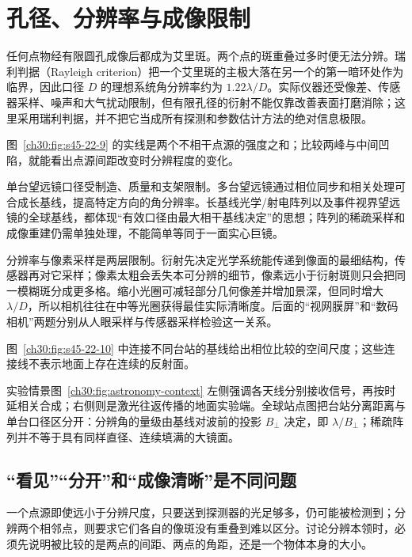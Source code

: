 \section{孔径、分辨率与成像限制}

任何点物经有限圆孔成像后都成为艾里斑。两个点的斑重叠过多时便无法分辨。瑞利判据（Rayleigh criterion）把一个艾里斑的主极大落在另一个的第一暗环处作为临界，因此口径 $D$ 的理想系统角分辨率约为 $1.22\lambda/D$。实际仪器还受像差、传感器采样、噪声和大气扰动限制，但有限孔径的衍射不能仅靠改善表面打磨消除；这里采用瑞利判据，并不把它当成所有探测和参数估计方法的绝对信息极限。

\ResolutionPanel
图~\ref{ch30:fig:s45-22-9} 的实线是两个不相干点源的强度之和；比较两峰与中间凹陷，就能看出点源间距改变时分辨程度的变化。

单台望远镜口径受制造、质量和支架限制。多台望远镜通过相位同步和相关处理可合成长基线，提高特定方向的角分辨率。长基线光学/射电阵列以及事件视界望远镜的全球基线，都体现“有效口径由最大相干基线决定”的思想；阵列的稀疏采样和成像重建仍需单独处理，不能简单等同于一面实心巨镜。

分辨率与像素采样是两层限制。衍射先决定光学系统能传递到像面的最细结构，传感器再对它采样；像素太粗会丢失本可分辨的细节，像素远小于衍射斑则只会把同一模糊斑分成更多格。缩小光圈可减轻部分几何像差并增加景深，但同时增大 $\lambda/D$，所以相机往往在中等光圈获得最佳实际清晰度。后面的“视网膜屏”和“数码相机”两题分别从人眼采样与传感器采样检验这一关系。

\ArrayDiagram
图~\ref{ch30:fig:s45-22-10} 中连接不同台站的基线给出相位比较的空间尺度；这些连接线不表示地面上存在连续的反射面。

实验情景图~\ref{ch30:fig:astronomy-context} 左侧强调各天线分别接收信号，再按时延相关合成；右侧则是激光往返传播的地面实验端。全球站点图把台站分离距离与单台口径区分开：分辨角的量级由基线对波前的投影 $B_\perp$ 决定，即 $\lambda/B_\perp$；稀疏阵列并不等于具有同样直径、连续填满的大镜面。


\subsection{“看见”“分开”和“成像清晰”是不同问题}
一个点源即使远小于分辨尺度，只要送到探测器的光足够多，仍可能被检测到；分辨两个相邻点，则要求它们各自的像斑没有重叠到难以区分。讨论分辨本领时，必须先说明被比较的是两点的间距、两点的角距，还是一个物体本身的大小。

